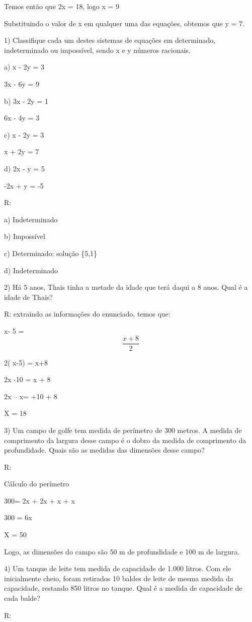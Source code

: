 Temos então que 2x = 18, logo x = 9

Substituindo o valor de x em qualquer uma das equações, obtemos que y =
7.


1) Classifique cada um destes sistemas de equações em determinado,
indeterminado ou impossível, sendo x e y números racionais.

a) x - 2y = 3

3x - 6y = 9

b) 3x - 2y = 1

6x - 4y = 3

c) x - 2y = 3

x + 2y = 7

d) 2x - y = 5

-2x + y = -5

R:

a) Indeterminado

b) Impossível

c) Determinado: solução \{5,1\}

d) Indeterminado

2) Há 5 anos, Thais tinha a metade da idade que terá daqui a 8 anos.
Qual é a idade de Thais?

R: extraindo as informações do enunciado, temos que:

x- 5 = \[\frac{x + 8}{2}\]

2( x-5) = x+8

2x -10 = x + 8

2x -- x= +10 + 8

X = 18

3) Um campo de golfe tem medida de perímetro de 300 metros. A medida de
comprimento da largura desse campo é o dobro da medida de comprimento da
profundidade. Quais são as medidas das dimensões desse campo?

R:

Cálculo do perímetro

300= 2x + 2x + x + x

300 = 6x

X = 50

Logo, as dimensões do campo são 50 m de profundidade e 100 m de largura.

4) Um tanque de leite tem medida de capacidade de 1.000 litros. Com ele
inicialmente cheio, foram retirados 10 baldes de leite de mesma medida
da capacidade, restando 850 litros no tanque. Qual é a medida de
capacidade de cada balde?

R:

